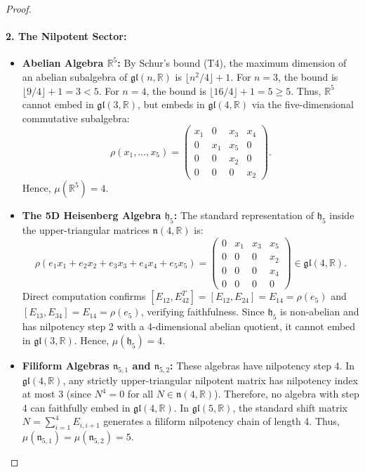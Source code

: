 \documentclass[11pt,a4paper]{article}
\theoremstyle{definition}
\theoremstyle{remark}
\newcommand{\R}{\mathbb{R}}
\newcommand{\hh}{\mathfrak{h}}
\begin{document}
\begin{proof}
\paragraph{2. The Nilpotent Sector:}
\begin{itemize}
    \item \textbf{Abelian Algebra $\R^5$:} By Schur's bound (T4), the maximum dimension of an abelian subalgebra of $\mathfrak{gl}(n, \R)$ is $\lfloor n^2 / 4 \rfloor + 1$. For $n = 3$, the bound is $\lfloor 9/4 \rfloor + 1 = 3 < 5$. For $n = 4$, the bound is $\lfloor 16/4 \rfloor + 1 = 5 \ge 5$. Thus, $\R^5$ cannot embed in $\mathfrak{gl}(3, \R)$, but embeds in $\mathfrak{gl}(4, \R)$ via the five-dimensional commutative subalgebra:
    \begin{equation}
        \rho(x_1, \dots, x_5) = \begin{pmatrix} x_1 & 0 & x_3 & x_4 \\ 0 & x_1 & x_5 & 0 \\ 0 & 0 & x_2 & 0 \\ 0 & 0 & 0 & x_2 \end{pmatrix}.
    \end{equation}
    Hence, $\mu(\R^5) = 4$.
    
    \item \textbf{The 5D Heisenberg Algebra $\hh_5$:} The standard representation of $\hh_5$ inside the upper-triangular matrices $\mathfrak{n}(4, \R)$ is:
    \begin{equation}
        \rho(e_1 x_1 + e_2 x_2 + e_3 x_3 + e_4 x_4 + e_5 x_5) = \begin{pmatrix} 0 & x_1 & x_3 & x_5 \\ 0 & 0 & 0 & x_2 \\ 0 & 0 & 0 & x_4 \\ 0 & 0 & 0 & 0 \end{pmatrix} \in \mathfrak{gl}(4, \R).
    \end{equation}
    Direct computation confirms $[E_{12}, E_{42}^T] = [E_{12}, E_{24}] = E_{14} = \rho(e_5)$ and $[E_{13}, E_{34}] = E_{14} = \rho(e_5)$, verifying faithfulness. Since $\hh_5$ is non-abelian and has nilpotency step 2 with a 4-dimensional abelian quotient, it cannot embed in $\mathfrak{gl}(3, \R)$. Hence, $\mu(\hh_5) = 4$.
    
    \item \textbf{Filiform Algebras $\mathfrak{n}_{5,1}$ and $\mathfrak{n}_{5,2}$:} These algebras have nilpotency step 4. In $\mathfrak{gl}(4, \R)$, any strictly upper-triangular nilpotent matrix has nilpotency index at most 3 (since $N^4 = 0$ for all $N \in \mathfrak{n}(4, \R)$). Therefore, no algebra with step 4 can faithfully embed in $\mathfrak{gl}(4, \R)$. In $\mathfrak{gl}(5, \R)$, the standard shift matrix $N = \sum_{i=1}^4 E_{i, i+1}$ generates a filiform nilpotency chain of length 4. Thus, $\mu(\mathfrak{n}_{5,1}) = \mu(\mathfrak{n}_{5,2}) = 5$.
\end{itemize}


\end{proof}
\end{document}
